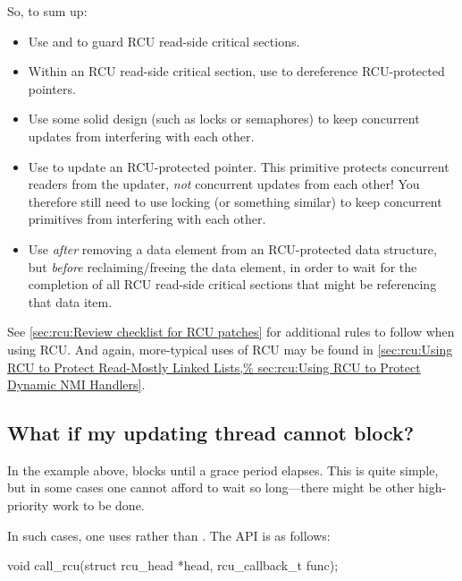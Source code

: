 So, to sum up:

\begin{itemize}
\item	Use  and  to guard RCU
	read-side critical sections.

\item	Within an RCU read-side critical section, use 
	to dereference RCU-protected pointers.

\item	Use some solid design (such as locks or semaphores) to
	keep concurrent updates from interfering with each other.

\item	Use  to update an RCU-protected pointer.
	This primitive protects concurrent readers from the updater,
	\emph{not} concurrent updates from each other!
	You therefore still
	need to use locking (or something similar) to keep concurrent
	 primitives from interfering with each other.

\item	Use  \emph{after} removing a data element from an
	RCU-protected data structure, but \emph{before} reclaiming/freeing
	the data element, in order to wait for the completion of all
	RCU read-side critical sections that might be referencing that
	data item.
\end{itemize}

See \cref{sec:rcu:Review checklist for RCU patches}
for additional rules to follow when using RCU\@.
And again, more-typical uses of RCU may be found in
\cref{sec:rcu:Using RCU to Protect Read-Mostly Linked Lists,%
sec:rcu:Using RCU to Protect Dynamic NMI Handlers}.


\subsection{What if my updating thread cannot block?}
\label{sec:rcu:What if my updating thread cannot block?}

In the example above,  blocks until a grace period elapses.
This is quite simple, but in some cases one cannot afford to wait so
long---there might be other high-priority work to be done.

In such cases, one uses  rather than .
The  API is as follows:

\begin{VerbatimU}
	void call_rcu(struct rcu_head *head, rcu_callback_t func);
\end{VerbatimU}

